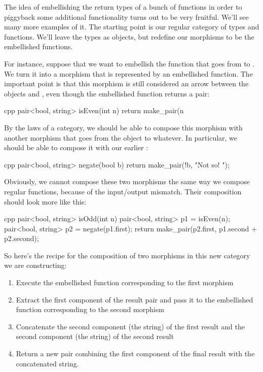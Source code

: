 The idea of embellishing the return types of a bunch of functions in
order to piggyback some additional functionality turns out to be very
fruitful. We'll see many more examples of it. The starting point is our
regular category of types and functions. We'll leave the types as
objects, but redefine our morphisms to be the embellished functions.

For instance, suppose that we want to embellish the function
 that goes from  to . We turn it
into a morphism that is represented by an embellished function. The
important point is that this morphism is still considered an arrow
between the objects  and , even though the
embellished function returns a pair:

\begin{snip}{cpp}
pair<bool, string> isEven(int n) {
    return make_pair(n %
}
\end{snip}
By the laws of a category, we should be able to compose this morphism
with another morphism that goes from the object  to
whatever. In particular, we should be able to compose it with our
earlier :

\begin{snip}{cpp}
pair<bool, string> negate(bool b) {
    return make_pair(!b, "Not so! ");
}
\end{snip}
Obviously, we cannot compose these two morphisms the same way we compose
regular functions, because of the input/output mismatch. Their
composition should look more like this:

\begin{snip}{cpp}
pair<bool, string> isOdd(int n) {
    pair<bool, string> p1 = isEven(n);
    pair<bool, string> p2 = negate(p1.first);
    return make_pair(p2.first, p1.second + p2.second);
}
\end{snip}
So here's the recipe for the composition of two morphisms in this new
category we are constructing:

\begin{enumerate}
\tightlist
\item
  Execute the embellished function corresponding to the first morphism
\item
  Extract the first component of the result pair and pass it to the
  embellished function corresponding to the second morphism
\item
  Concatenate the second component (the string) of the first result
  and the second component (the string) of the second result
\item
  Return a new pair combining the first component of the final result
  with the concatenated string.
\end{enumerate}

